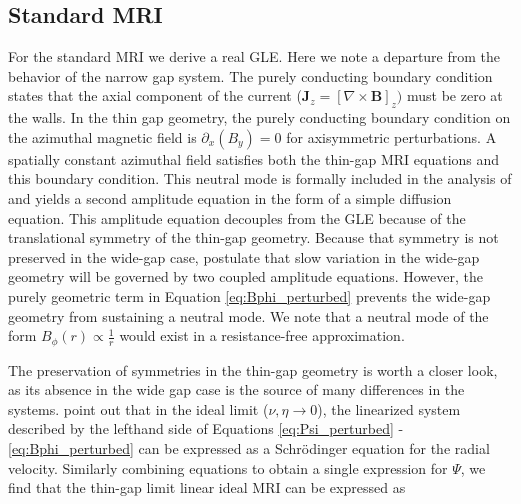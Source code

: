 \documentclass{emulateapj}
\newcommand{\citei}[1]{\citeauthor{#1} \citeyear{#1}}
\begin{document}

\subsection{Standard MRI}
\label{sec:SMRI}
For the standard MRI we derive a real GLE. Here we note a departure from the behavior of the narrow gap system. The purely conducting boundary condition states that the axial component of the current ($\mathbf{J}_z = [\nabla \times \mathbf{B}]_z)$ must be zero at the walls. In the thin gap geometry, the purely conducting boundary condition on the azimuthal magnetic field is $\partial_x(B_y) = 0$ for axisymmetric perturbations. A spatially constant azimuthal field satisfies both the thin-gap MRI equations and this boundary condition. This neutral mode is formally included in the analysis of \citei{Umurhan:2007hs} and yields a second amplitude equation in the form of a simple diffusion equation. This amplitude equation decouples from the GLE because of the translational symmetry of the thin-gap geometry. Because that symmetry is not preserved in the wide-gap case, \citeauthor{Umurhan:2007hs} postulate that slow variation in the wide-gap geometry will be governed by two coupled amplitude equations. %
However, the purely geometric term in Equation \ref{eq:Bphi_perturbed} prevents the wide-gap geometry from sustaining a neutral mode. We note that a neutral mode of the form $B_\phi(r) \propto \frac{1}{r}$ would exist in a resistance-free approximation.

The preservation of symmetries in the thin-gap geometry is worth a closer look, as its absence in the wide gap case is the source of many differences in the systems. \citei{Latter:2015} point out that in the ideal limit ($\nu, \eta \rightarrow 0$), the linearized system described by the lefthand side of Equations \ref{eq:Psi_perturbed} - \ref{eq:Bphi_perturbed} can be expressed as a Schr{\"o}dinger equation for the radial velocity. Similarly combining equations to obtain a single expression for $\Psi$, we find that the thin-gap limit linear ideal MRI can be expressed as
\end{document}
